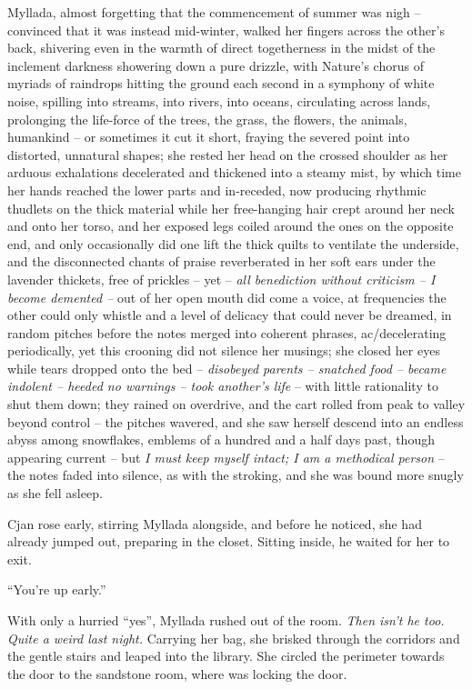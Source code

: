 Myllada, almost forgetting that the commencement of summer was nigh -- convinced that it was instead mid-winter, walked her fingers across the other's back, shivering even in the warmth of direct togetherness in the midst of the inclement darkness showering down a pure drizzle, with Nature's chorus of myriads of raindrops hitting the ground each second in a symphony of white noise, spilling into streams, into rivers, into oceans, circulating across lands, prolonging the life-force of the trees, the grass, the flowers, the animals, humankind -- or sometimes it cut it short, fraying the severed point into distorted, unnatural shapes; she rested her head on the crossed shoulder as her arduous exhalations decelerated and thickened into a steamy mist, by which time her hands reached the lower parts and in-receded, now producing rhythmic thudlets on the thick material while her free-hanging hair crept around her neck and onto her torso, and her exposed legs coiled around the ones on the opposite end, and only occasionally did one lift the thick quilts to ventilate the underside, and the disconnected chants of praise reverberated in her soft ears under the lavender thickets, free of prickles -- yet -- \emph{all benediction without criticism -- I become demented -- } out of her open mouth did come a voice, at frequencies the other could only whistle and a level of delicacy that could never be dreamed, in random pitches before the notes merged into coherent phrases, ac/decelerating periodically, yet this crooning did not silence her musings; she closed her eyes while tears dropped onto the bed -- \emph{disobeyed parents -- snatched food -- became indolent -- heeded no warnings -- took another's life} -- with little rationality to shut them down; they rained on overdrive, and the cart rolled from peak to valley beyond control -- the pitches wavered, and she saw herself descend into an endless abyss among snowflakes, emblems of a hundred and a half days past, though appearing current -- but \emph{I must keep myself intact; I am a methodical person} -- the notes faded into silence, as with the stroking, and she was bound more snugly as she fell asleep.

\centeredstars

Cjan rose early, stirring Myllada alongside, and before he noticed, she had already jumped out, preparing in the closet. Sitting inside, he waited for her to exit.

``You're up early.''

With only a hurried ``yes'', Myllada rushed out of the room. \emph{Then isn't he too. Quite a weird last night.} Carrying her bag, she brisked through the corridors and the gentle stairs and leaped into the library. She circled the perimeter towards the door to the sandstone room, where \yronsyncra{} was locking the door.

